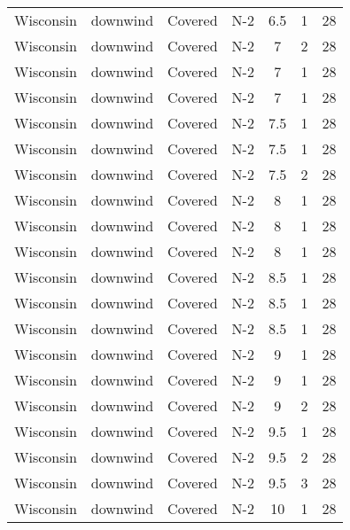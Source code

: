 \documentclass{article}
\begin{document}
\begin{longtable}[c]{ccccccc}
Wisconsin & downwind  & Covered     & N-2             & 6.5          & 1           & 28  \\
Wisconsin & downwind  & Covered     & N-2             & 7            & 2           & 28  \\
Wisconsin & downwind  & Covered     & N-2             & 7            & 1           & 28  \\
Wisconsin & downwind  & Covered     & N-2             & 7            & 1           & 28  \\
Wisconsin & downwind  & Covered     & N-2             & 7.5          & 1           & 28  \\
Wisconsin & downwind  & Covered     & N-2             & 7.5          & 1           & 28  \\
Wisconsin & downwind  & Covered     & N-2             & 7.5          & 2           & 28  \\
Wisconsin & downwind  & Covered     & N-2             & 8            & 1           & 28  \\
Wisconsin & downwind  & Covered     & N-2             & 8            & 1           & 28  \\
Wisconsin & downwind  & Covered     & N-2             & 8            & 1           & 28  \\
Wisconsin & downwind  & Covered     & N-2             & 8.5          & 1           & 28  \\
Wisconsin & downwind  & Covered     & N-2             & 8.5          & 1           & 28  \\
Wisconsin & downwind  & Covered     & N-2             & 8.5          & 1           & 28  \\
Wisconsin & downwind  & Covered     & N-2             & 9            & 1           & 28  \\
Wisconsin & downwind  & Covered     & N-2             & 9            & 1           & 28  \\
Wisconsin & downwind  & Covered     & N-2             & 9            & 2           & 28  \\
Wisconsin & downwind  & Covered     & N-2             & 9.5          & 1           & 28  \\
Wisconsin & downwind  & Covered     & N-2             & 9.5          & 2           & 28  \\
Wisconsin & downwind  & Covered     & N-2             & 9.5          & 3           & 28  \\
Wisconsin & downwind  & Covered     & N-2             & 10           & 1           & 28  \\

\end{longtable}
\end{document}
